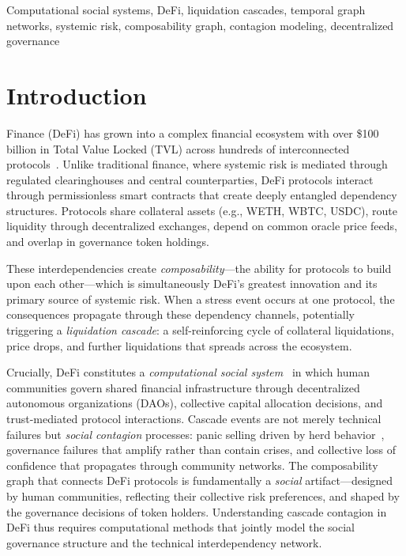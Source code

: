 \documentclass[journal]{IEEEtran}
\begin{document}
\begin{IEEEkeywords}
Computational social systems, DeFi, liquidation cascades, temporal graph networks, systemic risk, composability graph, contagion modeling, decentralized governance
\end{IEEEkeywords}

\section{Introduction}

 Finance (DeFi) has grown into a complex financial ecosystem with over \$100 billion in Total Value Locked (TVL) across hundreds of interconnected protocols~\cite{werner2022defi}.
Unlike traditional finance, where systemic risk is mediated through regulated clearinghouses and central counterparties, DeFi protocols interact through permissionless smart contracts that create deeply entangled dependency structures.
Protocols share collateral assets (e.g., WETH, WBTC, USDC), route liquidity through decentralized exchanges, depend on common oracle price feeds, and overlap in governance token holdings.

These interdependencies create \emph{composability}---the ability for protocols to build upon each other---which is simultaneously DeFi's greatest innovation and its primary source of systemic risk.
When a stress event occurs at one protocol, the consequences propagate through these dependency channels, potentially triggering a \emph{liquidation cascade}: a self-reinforcing cycle of collateral liquidations, price drops, and further liquidations that spreads across the ecosystem.

Crucially, DeFi constitutes a \emph{computational social system}~\cite{wang2020computational} in which human communities govern shared financial infrastructure through decentralized autonomous organizations (DAOs), collective capital allocation decisions, and trust-mediated protocol interactions.
Cascade events are not merely technical failures but \emph{social contagion} processes: panic selling driven by herd behavior~\cite{da2022crypto}, governance failures that amplify rather than contain crises, and collective loss of confidence that propagates through community networks.
The composability graph that connects DeFi protocols is fundamentally a \emph{social} artifact---designed by human communities, reflecting their collective risk preferences, and shaped by the governance decisions of token holders.
Understanding cascade contagion in DeFi thus requires computational methods that jointly model the social governance structure and the technical interdependency network.
\end{document}
